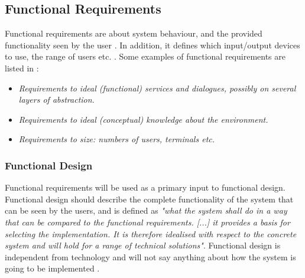 \subsection{Functional Requirements}
Functional requirements are about system behaviour, and the provided functionality seen by the user \cite{systemutviklingDel1}. In addition, it defines which input/output devices to use, the range of users etc. \cite{mmi}. Some examples of functional requirements are listed in \cite{systemutviklingDel1}:
\begin{itemize}
\item \emph{Requirements to ideal (functional) services and dialogues, possibly on several layers of abstraction.}
\item \emph{Requirements to ideal (conceptual) knowledge about the environment.}
\item \emph{Requirements to size: numbers of users, terminals etc.}
\end{itemize}     

\subsubsection{Functional Design}
Functional requirements will be used as a primary input to functional design. Functional design should describe the complete functionality of the system that can be seen by the users, and is defined as \emph{"what the system shall do in a way that can be compared to the functional requirements. [...] it provides a basis for selecting the implementation. It is therefore idealised with respect to the concrete system and will hold for a range of technical solutions"}. Functional design is independent from technology and will not say anything about how the system is going to be implemented \cite{systemutviklingDel1}. 

